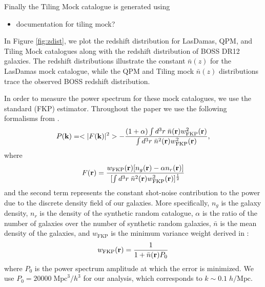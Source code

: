 \documentclass{emulateapj}
\begin{document}
Finally the Tiling Mock catalogue is generated using 
\begin{itemize}
\item documentation for tiling mock? 
\end{itemize}

In Figure \ref{fig:zdist}, we plot the redshift distribution for LasDamas, QPM, and Tiling Mock catalogues along with the redshift distribution of BOSS DR12 galaxies. The redshift distributions illustrate the constant $\bar{n}(z)$ for the LasDamas mock catalogue, while the QPM and Tiling mock $\bar{n}(z)$ distributions trace the observed BOSS redshift distribution. 

In order to measure the power spectrum for these mock catalogues, we use the standard \cite{Feldman:1994aa} (FKP) estimator. Throughout the paper we use the following formalisms from \cite{Feldman:1994aa}.
\begin{equation} \label{eq:fkppk}
P({\bf k}) = <|F({\bf k})|^2> - \frac{(1+\alpha) \int d^3r \;\bar{n}({\bf r})w_{\mathrm{FKP}}^2({\bf r})} {\int d^3r \; \bar{n}^2({\bf r})w_{\mathrm{FKP}}^2({\bf r})},
\end{equation}  
where
\begin{equation}
F({\bf r}) = \frac{w_\mathrm{FKP}({\bf r}) [n_g({\bf r}) - \alpha n_r({\bf r})]} {[\int d^3r \; \bar{n}^2({\bf r})w_\mathrm{FKP}^2({\bf r})]^{\frac{1}{2}}} 
\end{equation}
and the second term represents the constant shot-noise contribution to the power due to the discrete density field of our galaxies. More specifically, $n_g$ is the galaxy density, $n_r$ is the density of the synthetic random catalogue, $\alpha$ is the ratio of the number of galaxies over the number of synthetic random galaxies, $\bar{n}$ is the mean density of the galaxies, and $w_{\mathrm{FKP}}$ is the minimum variance weight derived in \cite{Feldman:1994aa}: 
\begin{equation}
w_{\mathrm{FKP}} ({\bf r}) = \frac{1}{1+\bar{n}({\bf r}) P_0}
\end{equation}
where $P_0$ is the power spectrum amplitude at which the error is minimized. We use $P_0 = 20000\; \mathrm{Mpc}^3/h^3$ for our analysis, which corresponds to $k \sim 0.1\; h/\mathrm{Mpc}$.  
\end{document}
